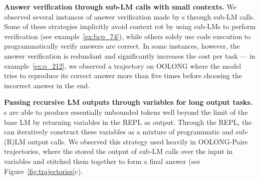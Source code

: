 \textbf{Answer verification through sub-LM calls with small contexts.} We observed several instances of answer verification made by \RLM{}s through sub-LM calls. Some of these strategies implicitly avoid context rot by using sub-LMs to perform verification (see example~\ref{ex:bcp_74}), while others solely use code execution to programmatically verify answers are correct. In some instances, however, the answer verification is redundant and significantly increases the cost per task — in example~\ref{ex:o_212}, we observed a trajectory on OOLONG where the model tries to reproduce its correct answer more than five times before choosing the incorrect answer in the end.


\textbf{Passing recursive LM outputs through variables for long output tasks.} \RLM{}s are able to produce essentially unbounded tokens well beyond the limit of the base LM by returning variables in the REPL as output. Through the REPL, the \RLM{} can iteratively construct these variables as a mixture of programmatic and sub-(R)LM output calls. We observed this strategy used heavily in OOLONG-Pairs trajectories, where the \RLM{} stored the output of sub-LM calls over the input in variables and stitched them together to form a final answer (see Figure~\ref{fig:trajectories}c).

